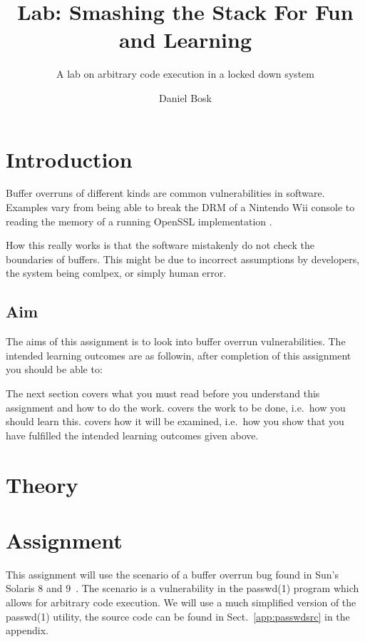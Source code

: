 \title{Lab: Smashing the Stack For Fun and Learning}
\subtitle{A lab on arbitrary code execution in a locked down system}

\author{%
  Daniel Bosk
}

\maketitle


\section{Introduction}
\label{sec:intro}
Buffer overruns of different kinds are common vulnerabilities in software.
Examples vary from being able to break the DRM of a Nintendo Wii console 
\cite{twilighthack} to reading the memory of a running OpenSSL implementation 
\cite{heartbleed}.

How this really works is that the software mistakenly do not check the 
boundaries of buffers.
This might be due to incorrect assumptions by developers, the system being 
comlpex, or simply human error.

\subsection{Aim}
\label{sec:aim}
The aims of this assignment is to look into buffer overrun vulnerabilities.
The intended learning outcomes are as followin, after completion of this 
assignment you should be able to:
\begin{itemize}
  
\end{itemize}

The next section covers what you must read before you understand this 
assignment and how to do the work.
 covers the work to be done, i.e.~how you should learn this.
 covers how it will be examined, i.e.~how you show that you have 
fulfilled the intended learning outcomes given above.


\section{Theory}
\label{sec:reading}



\section{Assignment}
\label{sec:tasks}
This assignment will use the scenario of a buffer overrun bug found in Sun's 
Solaris 8 and 9~\cite{passwdbug}.
The scenario is a vulnerability in the passwd(1) program which allows for 
arbitrary code execution.
We will use a much simplified version of the passwd(1) utility, the source code 
can be found in Sect.~\ref{app:passwdsrc} in the appendix.

